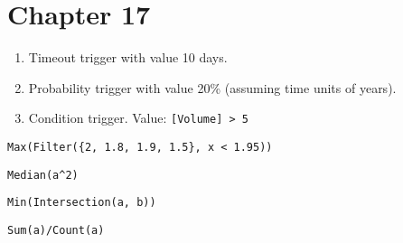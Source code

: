 \documentclass[]{memoir}
\begin{document}
\section{Chapter 17}


\begin{enumerate}
\def\labelenumi{\arabic{enumi}.}
\itemsep1pt\parskip0pt
\item
  Timeout trigger with value 10 days.
\item
  Probability trigger with value 20\% (assuming time units of years).
\item
  Condition trigger. Value: \lstinline![Volume] > 5!
\end{enumerate}


\lstinline!Max(Filter({2, 1.8, 1.9, 1.5}, x < 1.95))!


\lstinline!Median(a^2)!


\lstinline!Min(Intersection(a, b))!


\lstinline!Sum(a)/Count(a)!

\end{document}

